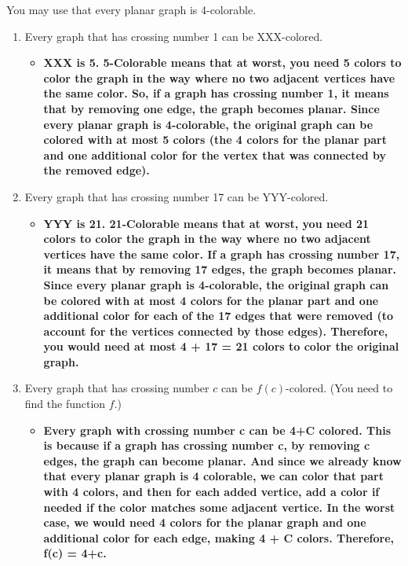 \documentclass[12pt]{article}
\begin{document}
\begin{enumerate}
You may use that every planar graph is 4-colorable. 

\begin{enumerate}
\item
Every graph that has crossing number 1 can be XXX-colored.
\begin{itemize}
    \item \textbf{XXX is 5. 5-Colorable means that at worst, you need 5 colors to color the graph in the way where no two adjacent vertices have the same color. So, if a graph has crossing number 1, it means that by removing one edge, the graph becomes planar. Since every planar graph is 4-colorable, the original graph can be colored with at most 5 colors (the 4 colors for the planar part and one additional color for the vertex that was connected by the removed edge).}
\end{itemize}

\item
Every graph that has crossing number 17 can be YYY-colored.
\begin{itemize}
    \item \textbf{YYY is 21. 21-Colorable means that at worst, you need 21 colors to color the graph in the way where no two adjacent vertices have the same color. If a graph has crossing number 17, it means that by removing 17 edges, the graph becomes planar. Since every planar graph is 4-colorable, the original graph can be colored with at most 4 colors for the planar part and one additional color for each of the 17 edges that were removed (to account for the vertices connected by those edges). Therefore, you would need at most 4 + 17 = 21 colors to color the original graph.}
\end{itemize}

\item
Every graph that has crossing number $c$ can be $f(c)$-colored.
(You need to find the function $f$.)
\begin{itemize}
    \item \textbf{Every graph with crossing number c can be 4+C colored. This is because if a graph has crossing number c, by removing c edges, the graph can become planar. And since we already know that every planar graph is 4 colorable, we can color that part with 4 colors, and then for each added vertice, add a color if needed if the color matches some adjacent vertice. In the worst case, we would need 4 colors for the planar graph and one additional color for each edge, making 4 + C colors. Therefore, f(c) = 4+c.}
\end{itemize}
\end{enumerate}

\end{enumerate}
\end{document}
